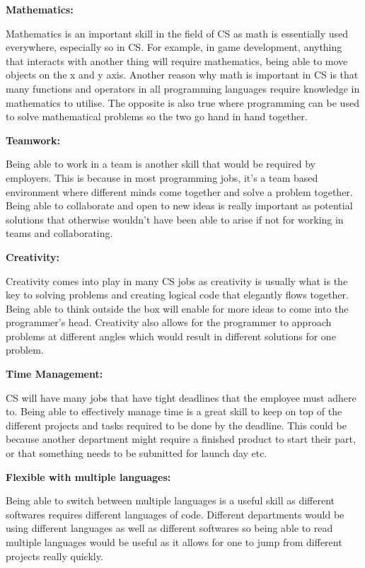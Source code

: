 \documentclass[a4paper, 11pt]{report}
\begin{document}
\bigskip

\textbf{Mathematics:}
\par Mathematics is an important skill in the field of CS as math is essentially used everywhere, especially so in CS. For example, in game development, anything that interacts with another thing will require mathematics, being able to move objects on the x and y axis. Another reason why math is important in CS is that many functions and operators in all programming languages require knowledge in mathematics to utilise. The opposite is also true where programming can be used to solve mathematical problems so the two go hand in hand together.

\bigskip

\textbf{Teamwork:}
\par Being able to work in a team is another skill that would be required by employers. This is because in most programming jobs, it’s a team based environment where different minds come together and solve a problem together. Being able to collaborate and open to new ideas is really important as potential solutions that otherwise wouldn’t  have been able to arise if not for working in teams and collaborating. 

\bigbreak 

\textbf{Creativity:}
\par Creativity comes into play in many CS jobs as creativity is usually what is the key to solving problems and creating logical  code that elegantly flows together. Being able to think outside the box will enable for more ideas to come into the programmer's head. Creativity also allows for the programmer to approach problems at different angles which would result in different solutions for one problem. 

\bigskip

\textbf{Time Management:}
\par CS will have many jobs that have tight deadlines that the employee must adhere to. Being able to effectively manage time is a great skill to keep on top of the different projects and tasks required to be done by the deadline. This could be because another department might require a finished product to start their part, or that something needs to be submitted for launch day etc. 

\bigskip

\textbf{Flexible with multiple languages:}
\par Being able to switch between multiple languages is a useful skill as different softwares requires different languages of code. Different departments would be using different languages as well as different softwares so being able to read multiple languages would be useful as it allows for one to jump from different projects really quickly. 
\end{document}
